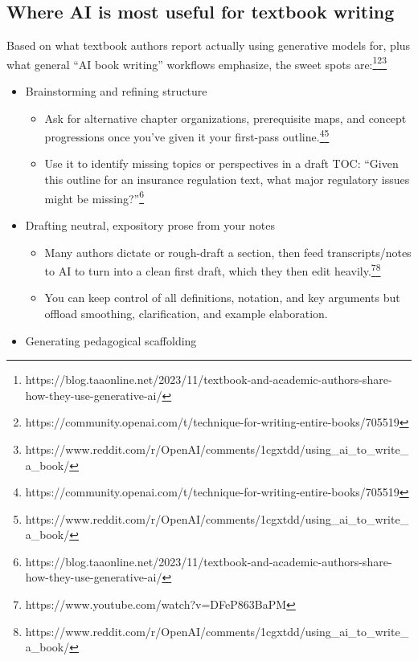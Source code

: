 \documentclass[
  11pt,
]{article}
\providecommand{\tightlist}{%
  \setlength{\itemsep}{0pt}\setlength{\parskip}{0pt}}
\begin{document}
\subsection{Where AI is most useful for textbook writing}\label{where-ai-is-most-useful-for-textbook-writing}

Based on what textbook authors report actually using generative models for, plus what general ``AI book writing'' workflows emphasize, the sweet spots are:\footnote{https://blog.taaonline.net/2023/11/textbook-and-academic-authors-share-how-they-use-generative-ai/}\footnote{https://community.openai.com/t/technique-for-writing-entire-books/705519}\footnote{https://www.reddit.com/r/OpenAI/comments/1cgxtdd/using\_ai\_to\_write\_a\_book/}

\begin{itemize}
\tightlist
\item
  Brainstorming and refining structure

  \begin{itemize}
  \tightlist
  \item
    Ask for alternative chapter organizations, prerequisite maps, and concept progressions once you've given it your first-pass outline.\footnote{https://community.openai.com/t/technique-for-writing-entire-books/705519}\footnote{https://www.reddit.com/r/OpenAI/comments/1cgxtdd/using\_ai\_to\_write\_a\_book/}
  \item
    Use it to identify missing topics or perspectives in a draft TOC: ``Given this outline for an insurance regulation text, what major regulatory issues might be missing?''\footnote{https://blog.taaonline.net/2023/11/textbook-and-academic-authors-share-how-they-use-generative-ai/}
  \end{itemize}
\item
  Drafting neutral, expository prose from your notes

  \begin{itemize}
  \tightlist
  \item
    Many authors dictate or rough-draft a section, then feed transcripts/notes to AI to turn into a clean first draft, which they then edit heavily.\footnote{https://www.youtube.com/watch?v=DFeP863BaPM}\footnote{https://www.reddit.com/r/OpenAI/comments/1cgxtdd/using\_ai\_to\_write\_a\_book/}
  \item
    You can keep control of all definitions, notation, and key arguments but offload smoothing, clarification, and example elaboration.
  \end{itemize}
\item
  Generating pedagogical scaffolding


\end{itemize}
\end{document}
